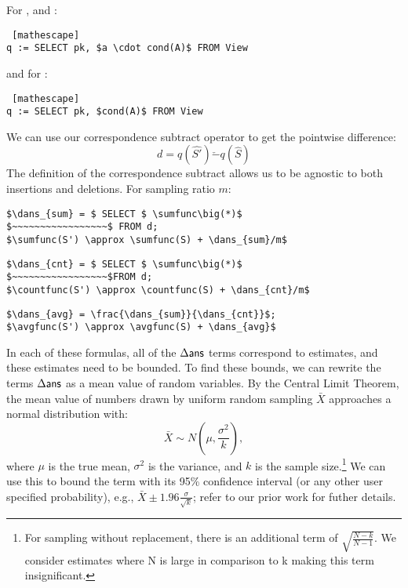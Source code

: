 For \sumfunc, and \avgfunc:
\begin{lstlisting} [mathescape]
q := SELECT pk, $a \cdot cond(A)$ FROM View
\end{lstlisting}

and for \countfunc:
\begin{lstlisting} [mathescape]
q := SELECT pk, $cond(A)$ FROM View
\end{lstlisting}

We can use our correspondence subtract operator to get the pointwise difference:
\[d = q(\hat{S'}) \check{-} q(\hat{S})\]  
The definition of the correspondence subtract allows us to be agnostic to both insertions and deletions.
For sampling ratio $m$:
\begin{lstlisting}[mathescape,basicstyle={\scriptsize}]
$\dans_{sum} = $ SELECT $ \sumfunc\big(*)$ 
$~~~~~~~~~~~~~~~~~$ FROM d;
$\sumfunc(S') \approx \sumfunc(S) + \dans_{sum}/m$
\end{lstlisting}

\begin{lstlisting}[mathescape,basicstyle={\scriptsize}]
$\dans_{cnt} = $ SELECT $ \sumfunc\big(*)$ 
$~~~~~~~~~~~~~~~~~$FROM d;
$\countfunc(S') \approx \countfunc(S) + \dans_{cnt}/m$
\end{lstlisting}


\begin{lstlisting}[mathescape,basicstyle={\scriptsize}]
$\dans_{avg} = \frac{\dans_{sum}}{\dans_{cnt}}$;
$\avgfunc(S') \approx \avgfunc(S) + \dans_{avg}$
\end{lstlisting}

In each of these formulas, all of the $\Delta\textsf{ans}$ terms correspond to estimates, and these estimates need to be bounded.
To find these bounds, we can rewrite the terms $\Delta\textsf{ans}$ as a mean value of random variables.
By the Central Limit Theorem, the mean value of numbers drawn by uniform random sampling $\bar{X}$ approaches a normal distribution with:
\[
\bar{X} \sim N(\mu,\frac{\sigma^2}{k}),
\]
where $\mu$ is the true mean, $\sigma^2$ is the variance, and $k$ is the sample size.\footnote{\scriptsize For sampling without replacement, there is an additional term of $\sqrt{\frac{N-k}{N-1}}$. We consider estimates where N is large in comparison to k making this term insignificant.}
We can use this to bound the term with its 95\% confidence interval (or any other user specified probability), e.g., $\bar{X} \pm 1.96 \frac{\sigma}{\sqrt{k}}$; refer to our prior work \cite{wang1999sample} for futher details.

